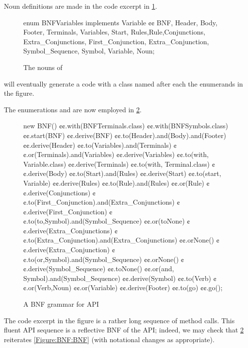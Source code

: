Noun definitions are made in the code excerpt in \cref{Figure:Nouns}.

\begin{figure}[htb]
  \begin{JAVA}[style=code]
enum BNFVariables implements Variable {¢¢
  BNF, Header, Body, Footer,
  Terminals, Variables, Start,
  Rules,Rule,Conjunctions, Extra_Conjunctions,
  First_Conjunction, Extra_Conjunction, Symbol_Sequence,
  Symbol, Variable, Noun;
}\end{JAVA}
  \caption{The nouns of \Self}
  \label{Figure:Nouns}
\end{figure}
  \Self will eventually generate a code with
  a class named after each the enumerands in the figure.

The
enumerations  and
  are now employed in \cref{Figure:BNF:fluent}.

\begin{figure}[htb]
  \begin{JAVA}[style=numbered]
new BNF()
  ¢¢.with(BNFTerminals.class)
  ¢¢.with(BNFSymbols.class)
  ¢¢.start(BNF)
  ¢¢.derive(BNF)
    ¢¢.to(Header).and(Body).and(Footer)
  ¢¢.derive(Header)
    ¢¢.to(Variables).and(Terminals)
    ¢¢.or(Terminals).and(Variables)
  ¢¢.derive(Variables)
    ¢¢.to(with, Variable.class)
  ¢¢.derive(Terminals)
    ¢¢.to(with, Terminal.class)
  ¢¢.derive(Body)
    ¢¢.to(Start).and(Rules)
  ¢¢.derive(Start)
    ¢¢.to(start, Variable)
  ¢¢.derive(Rules)
    ¢¢.to(Rule).and(Rules)
    ¢¢.or(Rule)
  ¢¢.derive(Conjunctions)
    ¢¢.to(First_Conjunction).and(Extra_Conjunctions)
  ¢¢.derive(First_Conjunction)
    ¢¢.to(to,Symbol).and(Symbol_Sequence)
    ¢¢.or(toNone)
  ¢¢.derive(Extra_Conjunctions)
    ¢¢.to(Extra_Conjunction).and(Extra_Conjunctions)
    ¢¢.orNone()
  ¢¢.derive(Extra_Conjunction)
    ¢¢.to(or,Symbol).and(Symbol_Sequence)
    ¢¢.orNone()
  ¢¢.derive(Symbol_Sequence)
    ¢¢.toNone()
    ¢¢.or(and, Symbol).and(Symbol_Sequence)
  ¢¢.derive(Symbol)
    ¢¢.to(Verb)
    ¢¢.or(Verb,Noun)
    ¢¢.or(Variable)
  ¢¢.derive(Footer)
    ¢¢.to(go)
¢¢.go();
\end{JAVA}
  \caption{A BNF grammar for \Self API}
  \label{Figure:BNF:fluent}
\end{figure}

The code excerpt in the figure is a rather long
  sequence of method calls.
This fluent API sequence is a reflective BNF
  of the \Self API;
  indeed, we may check that \cref{Figure:BNF:fluent} reiterates \cref{Figure:BNF:BNF}
  (with notational changes as appropriate).

